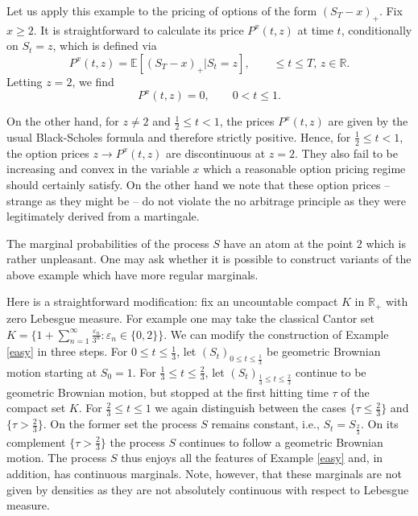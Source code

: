 \documentclass[11pt,a4paper]{article}%
\def\E{{\mathbb E}}
\def\R{{\mathbb R}}
\renewcommand{\epsilon}{\varepsilon}
\numberwithin{equation}{section}
\begin{document}
Let us apply this example to the pricing of options of the form 
$(S_T -x)_+$. Fix $x \ge 2$. It is straightforward to calculate its price $P^{x}(t,z)$ at time $t$, conditionally on $S_t = z$, which is defined via
\begin{equation} \label{cond}
P^{x}(t,z) = \E [(S_T -x)_+|S_t=z],   \qquad \le t\le T, \, z \in \R.
\end{equation}
Letting $z=2$, we find
\begin{equation}\label{case2}
P^{x}(t,z) =0, \qquad 0 <t \le 1.
\end{equation}

On the other hand, for $z \neq 2$ and $\frac{1}{2} \le t <1$, the prices $P^{x}(t,z)$ are given by the usual Black-Scholes formula and therefore strictly positive. Hence, for $\frac{1}{2} \le t <1$, the option prices $z \to P^{x}(t,z)$ are  discontinuous at $z=2$. They also fail to be increasing and convex in the variable $x$ which a reasonable option pricing regime should certainly satisfy. On the other hand we note that these option prices -- strange as they might be -- do not violate the no arbitrage principle as they were legitimately derived from a martingale.

\vspace{1em}


The marginal probabilities of the process $S$ have an atom at the point $2$ which is rather unpleasant. One may ask whether it is possible to construct variants of the above example which have more regular marginals. 

Here is a straightforward modification: fix an uncountable compact $K$ in $\R_+$ with zero Lebesgue measure. For example one may take the classical Cantor set $K = \{1 + \sum_{n=1}^{\infty} \frac{\epsilon_n}{3^n} : \epsilon_n \in \{0,2\}\}$. We can modify the construction of Example \ref{easy} in three steps. For $0 \le t \le \frac{1}{3}$, let $(S_t)_{0 \le t \le \frac{1}{3}}$ be geometric Brownian motion starting at $S_0 =1$. For $\frac{1}{3} \le t \le \frac{2}{3}$, let $(S_t)_{ \frac{1}{3}\le t\le \frac{2}{3}}$ continue to be geometric Brownian motion, but stopped at the first hitting time $\tau$ of the compact set $K$. For $\frac{2}{3} \le t \le 1$ we again distinguish between the cases $\{\tau \le \frac{2}{3}\}$ and $\{\tau > \frac{2}{3}\}$. On the former set the process $S$ remains constant, i.e., $S_t = S_{\frac{2}{3}}$. On its complement $\{\tau > \frac{2}{3}\}$ the process $S$ continues to follow a geometric Brownian motion. The process $S$ thus enjoys all the features of Example \ref{easy} and, in addition, has continuous marginals. Note, however, that these marginals are not given by densities as they are not absolutely continuous with respect to Lebesgue measure.
\end{document}
